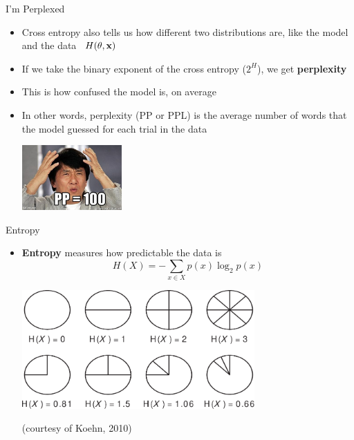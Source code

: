 \documentclass{beamer}
\newcommand{\detail}[1]{{\color{lightgrey}\small{}#1}}
\begin{document}
\begin{frame}{I'm Perplexed}
\begin{itemize}
	\item Cross entropy also tells us how different two distributions are, like the model and the data \ \detail{$H(\theta, {\bf x})$}
	\pause
	\item If we take the binary exponent of the cross entropy ($2^H$), we get \textbf{perplexity}
	\pause
	\item This is how confused the model is, on average
	\pause
	\item In other words, perplexity (PP or PPL) is the average number of words that the model guessed for each trial in the data
	\pause
	\begin{center}
		\vspace*{0.5em}
		\includegraphics[width=0.3\textwidth]{images/jackie_chan_perplexity.jpg}
	 \end{center}
\end{itemize}
\end{frame}

\begin{frame}{Entropy}
\begin{itemize}
	\item \textbf{Entropy} measures how predictable the data is
	\pause
	\begin{equation*}
	H(X) = - \sum_{x \in X} p(x) \log_2 p(x)
	\end{equation*}
	\pause
	\begin{center}
		\vspace*{0.5em}
		\includegraphics[width=0.7\textwidth]{images/koehn_2010_fig_3_4.pdf}
	 \end{center}
	{\tiny (courtesy of Koehn, 2010)}
\end{itemize}
\end{frame}
\end{document}
